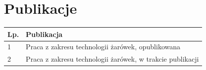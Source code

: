 \section*{Publikacje}
\begin{tabularx}{\textwidth}{@{}lX@{}}
\toprule
\textbf{Lp.} & \textbf{Publikacja} \\
\midrule
1 & Praca z zakresu technologii żarówek, opublikowana \\
2 & Praca z zakresu technologii żarówek, w trakcie publikacji \\
\bottomrule
\end{tabularx}